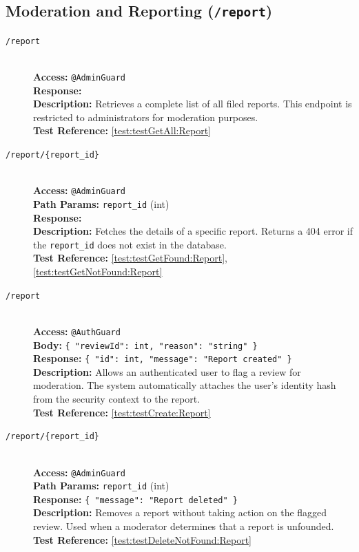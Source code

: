 \subsection{Moderation and Reporting (\texttt{/report})}
\begin{description}
	\item[\GET \quad \texttt{/report}] \hfill \\
	\textbf{Access:} \texttt{@AdminGuard} \\
	\textbf{Response:} \texttt{} \\
	\textbf{Description:} Retrieves a complete list of all filed reports. This endpoint is restricted to administrators for moderation purposes.\\
	\textbf{Test Reference:} \ref{test:testGetAll:Report}
	
	\item[\GET \quad \texttt{/report/\{report\_id\}}] \hfill \\
	\textbf{Access:} \texttt{@AdminGuard} \\
	\textbf{Path Params:} \texttt{report\_id} (int) \\
	\textbf{Response:} \texttt{} \\
	\textbf{Description:} Fetches the details of a specific report. Returns a 404 error if the \texttt{report\_id} does not exist in the database.\\
	\textbf{Test Reference:} \ref{test:testGetFound:Report}, \ref{test:testGetNotFound:Report}
	
	\item[\POST \quad \texttt{/report}] \hfill \\
	\textbf{Access:} \texttt{@AuthGuard} \\
	\textbf{Body:} \texttt{\{ "reviewId": int, "reason": "string" \}} \\
	\textbf{Response:} \texttt{\{ "id": int, "message": "Report created" \}} \\
	\textbf{Description:} Allows an authenticated user to flag a review for moderation. The system automatically attaches the user's identity hash from the security context to the report.\\
	\textbf{Test Reference:} \ref{test:testCreate:Report}
	
	\item[\DELETE \quad \texttt{/report/\{report\_id\}}] \hfill \\
	\textbf{Access:} \texttt{@AdminGuard} \\
	\textbf{Path Params:} \texttt{report\_id} (int) \\
	\textbf{Response:} \texttt{\{ "message": "Report deleted" \}} \\
	\textbf{Description:} Removes a report without taking action on the flagged review. Used when a moderator determines that a report is unfounded.\\
	\textbf{Test Reference:} \ref{test:testDeleteNotFound:Report}
	

\end{description}
